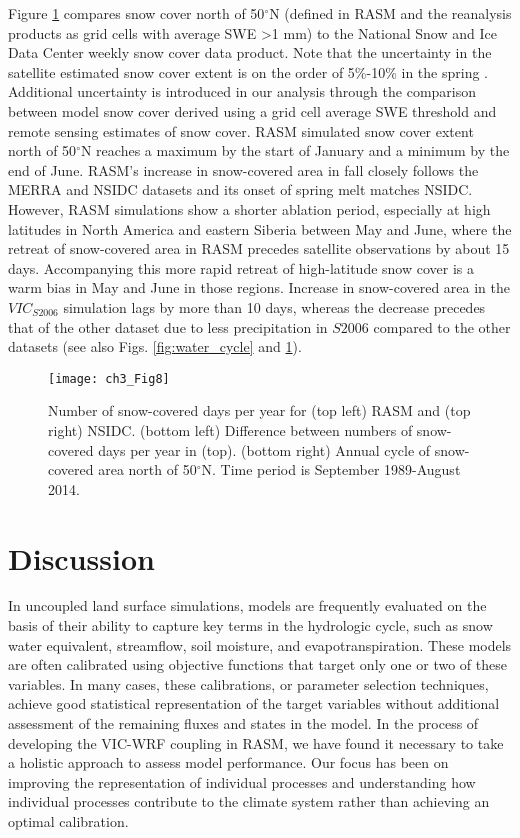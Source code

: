 Figure \ref{fig:snow} compares snow cover north of 50$^{\circ}$N (defined in RASM and the reanalysis products as grid cells with average SWE >1 mm) to the National Snow and Ice Data Center weekly snow cover data product.
Note that the uncertainty in the satellite estimated snow cover extent is on the order of 5\%-10\% in the spring \citep{Brown_2011}.
Additional uncertainty is introduced in our analysis through the comparison between model snow cover derived using a grid cell average SWE threshold and remote sensing estimates of snow cover.
RASM simulated snow cover extent north of 50$^{\circ}$N reaches a maximum by the start of January and a minimum by the end of June.
RASM’s increase in snow-covered area in fall closely follows the MERRA and NSIDC datasets and its onset of spring melt matches NSIDC.
However, RASM simulations show a shorter ablation period, especially at high latitudes in North America and eastern Siberia between May and June, where the retreat of snow-covered area in RASM precedes satellite observations by about 15 days.
Accompanying this more rapid retreat of high-latitude snow cover is a warm bias in May and June in those regions.
Increase in snow-covered area in the $VIC_{S2006}$ simulation lags by more than 10 days, whereas the decrease precedes that of the other dataset due to less precipitation in $S2006$ compared to the other datasets (see also Figs.
\ref{fig:water_cycle} and \ref{fig:snow}).


\begin{figure}
  \centering
  \texttt{[image: ch3\_Fig8]}
  \caption{Number of snow-covered days per year for (top left) RASM and (top right) NSIDC.
  (bottom left) Difference between numbers of snow-covered days per year in (top).
  (bottom right) Annual cycle of snow-covered area north of 50$^{\circ}$N.
  Time period is September 1989-August 2014.}
  \label{fig:snow}
\end{figure}

\section{Discussion}
\label{sec:discussion_ch3}

In uncoupled land surface simulations, models are frequently evaluated on the basis of their ability to capture key terms in the hydrologic cycle, such as snow water equivalent, streamflow, soil moisture, and evapotranspiration.
These models are often calibrated using objective functions that target only one or two of these variables.
In many cases, these calibrations, or parameter selection techniques, achieve good statistical representation of the target variables without additional assessment of the remaining fluxes and states in the model.
In the process of developing the VIC-WRF coupling in RASM, we have found it necessary to take a holistic approach to assess model performance.
Our focus has been on improving the representation of individual processes and understanding how individual processes contribute to the climate system rather than achieving an optimal calibration.

